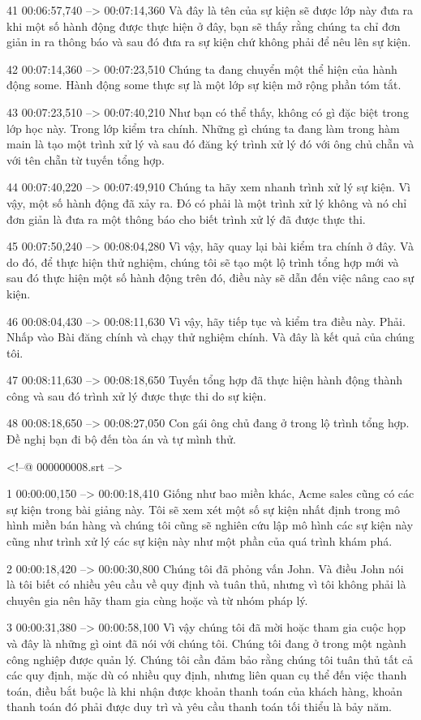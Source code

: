 41
00:06:57,740 --> 00:07:14,360
Và đây là tên của sự kiện sẽ được lớp này đưa ra khi một số hành động được thực hiện ở đây, bạn sẽ thấy rằng chúng ta chỉ đơn giản in ra thông báo và sau đó đưa ra sự kiện chứ không phải để nêu lên sự kiện.

42
00:07:14,360 --> 00:07:23,510
Chúng ta đang chuyển một thể hiện của hành động some.  Hành động some thực sự là một lớp sự kiện mở rộng phần tóm tắt.

43
00:07:23,510 --> 00:07:40,210
Như bạn có thể thấy, không có gì đặc biệt trong lớp học này.  Trong lớp kiểm tra chính.  Những gì chúng ta đang làm trong hàm main là tạo một trình xử lý và sau đó đăng ký trình xử lý đó với ông chủ chẵn và với tên chẵn từ tuyến tổng hợp.

44
00:07:40,220 --> 00:07:49,910
Chúng ta hãy xem nhanh trình xử lý sự kiện.  Vì vậy, một số hành động đã xảy ra.  Đó có phải là một trình xử lý không và nó chỉ đơn giản là đưa ra một thông báo cho biết trình xử lý đã được thực thi.

45
00:07:50,240 --> 00:08:04,280
Vì vậy, hãy quay lại bài kiểm tra chính ở đây.  Và do đó, để thực hiện thử nghiệm, chúng tôi sẽ tạo một lộ trình tổng hợp mới và sau đó thực hiện một số hành động trên đó, điều này sẽ dẫn đến việc nâng cao sự kiện.

46
00:08:04,430 --> 00:08:11,630
Vì vậy, hãy tiếp tục và kiểm tra điều này.  Phải.  Nhấp vào Bài đăng chính và chạy thử nghiệm chính.  Và đây là kết quả của chúng tôi.

47
00:08:11,630 --> 00:08:18,650
Tuyến tổng hợp đã thực hiện hành động thành công và sau đó trình xử lý được thực thi do sự kiện.

48
00:08:18,650 --> 00:08:27,050
Con gái ông chủ đang ở trong lộ trình tổng hợp. Đề nghị bạn đi bộ đến tòa án và tự mình thử.

<!--@ 000000008.srt -->

1
00:00:00,150 --> 00:00:18,410
Giống như bao miền khác, Acme sales cũng có các sự kiện trong bài giảng này.  Tôi sẽ xem xét một số sự kiện nhất định trong mô hình miền bán hàng và chúng tôi cũng sẽ nghiên cứu lập mô hình các sự kiện này cũng như trình xử lý các sự kiện này như một phần của quá trình khám phá.

2
00:00:18,420 --> 00:00:30,800
Chúng tôi đã phỏng vấn John.  Và điều John nói là tôi biết có nhiều yêu cầu về quy định và tuân thủ, nhưng vì tôi không phải là chuyên gia nên hãy tham gia cùng hoặc và từ nhóm pháp lý.

3
00:00:31,380 --> 00:00:58,100
Vì vậy chúng tôi đã mời hoặc tham gia cuộc họp và đây là những gì oint đã nói với chúng tôi.  Chúng tôi đang ở trong một ngành công nghiệp được quản lý.  Chúng tôi cần đảm bảo rằng chúng tôi tuân thủ tất cả các quy định, mặc dù có nhiều quy định, nhưng liên quan cụ thể đến việc thanh toán, điều bắt buộc là khi nhận được khoản thanh toán của khách hàng, khoản thanh toán đó phải được duy trì và yêu cầu thanh toán tối thiểu là  bảy năm.

